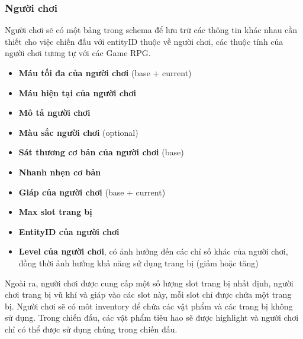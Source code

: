 \subsubsection{Người chơi}
\hspace*{1cm} Người chơi sẽ có một bảng trong schema để lưu trữ các thông tin khác nhau cần thiết cho việc chiến đấu với entityID thuộc về người chơi, các thuộc tính của người chơi tương tự với các Game RPG.\\
\begin{itemize}
	\item \textbf{Máu tối đa của người chơi} (base + current)
	\item \textbf{Máu hiện tại của người chơi}
	\item \textbf{Mô tả người chơi}
	\item \textbf{Màu sắc người chơi} (optional)
	\item \textbf{Sát thương cơ bản của người chơi} (base)
	\item \textbf{Nhanh nhẹn cơ bản}
	\item \textbf{Giáp của người chơi} (base + current)
	\item \textbf{Max slot trang bị}
	\item \textbf{EntityID của người chơi}
	\item \textbf{Level của người chơi}, có ảnh hưởng đến các chỉ số khác của người chơi, đồng thời ảnh hưởng khả năng sử dụng trang bị (giảm hoặc tăng)
\end{itemize}

\hspace*{1cm} Ngoài ra, người chơi được cung cấp một số lượng slot trang bị nhất định, người chơi trang bị vũ khí và giáp vào các slot này, mỗi slot chỉ được chứa một trang bị. Người chơi sẽ có môt inventory để chứa các vật phẩm và các trang bị không sử dụng. Trong chiến đấu, các vật phẩm tiêu hao sẽ được highlight và người chơi chỉ có thể được sử dụng chúng trong chiến đấu.
